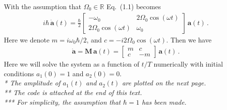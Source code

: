\documentclass[11pt, oneside]{book}
\theoremstyle{break}
\theoremstyle{break}
\newcommand{\R}{\mathbb{R}}
\newcommand{\C}{\mathbb{C}}
\newcommand{\bmat}[1]{\begin{bmatrix} #1 \end{bmatrix}}
\begin{document}
With the assumption that $\Omega_0 \in \R$ Eq.\ (1.1) becomes
\begin{align*}
i\hbar\, \dot{\mathbf{a}}(t) = \frac{\hbar}{2}
\bmat{
-\omega_0 & 2\Omega_0\cos(\omega t) \\
2\Omega_0\cos(\omega t) & \omega_0 
}\, \mathbf{a}(t)\,.
\end{align*}
Here we denote $m = i\omega_0\hbar/2$, and $c = -i2\Omega_0\cos(\omega t)$. Then we have
\begin{align*}
\dot{\mathbf{a}} = \mathbf{M}\, \mathbf{a}(t) = \bmat{m & c \\ c & -m}\, \mathbf{a}(t)\,.
\end{align*}
Here we will solve the system as a function of $t/T$ numerically with initial conditions $a_1(0) = 1$ and $a_2(0) = 0$. \\

\textit{* The amplitude of $a_1(t)$ and $a_2(t)$ are plotted on the next page. \\ 
** The code is attached at the end of this text.\\
*** For simplicity, the assumption that $\hbar = 1$ has been made.}
\newpage
\end{document}

